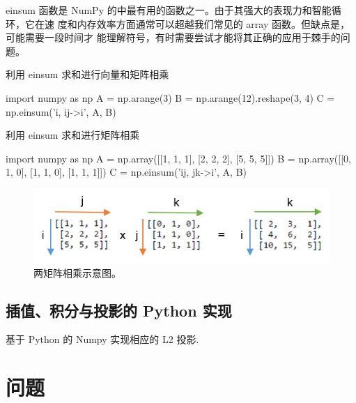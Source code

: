\documentclass{article}
\begin{document}
einsum 函数是 NumPy 的中最有用的函数之一。由于其强大的表现力和智能循环，它在速
度和内存效率方面通常可以超越我们常见的 array 函数。但缺点是，可能需要一段时间才
能理解符号，有时需要尝试才能将其正确的应用于棘手的问题。

\begin{listing}[H]
    \caption{利用 einsum 求和进行向量和矩阵相乘}
    \begin{pythoncode}
        import numpy as np
        A = np.arange(3)
        B = np.arange(12).reshape(3, 4)
        C = np.einsum('i, ij->i', A, B)
    \end{pythoncode}
\end{listing}

\begin{listing}[H]
    \caption{利用 einsum 求和进行矩阵相乘}
    \begin{pythoncode}
        import numpy as np
        A = np.array([[1, 1, 1], [2, 2, 2], [5, 5, 5]])
        B = np.array([[0, 1, 0], [1, 1, 0], [1, 1, 1]])
        C = np.einsum('ij, jk->i', A, B)
    \end{pythoncode}
\end{listing}

\begin{figure}[ht!]
    \centering
    \includegraphics[scale=1]{./figures/twomat.png}
    \caption{两矩阵相乘示意图。}
    \label{fig:twomat}
\end{figure}

\subsection{插值、积分与投影的 Python 实现}

基于 Python 的 Numpy 实现相应的 L2 投影.

\section{问题}

\cite{fem_2010}


\end{document}
